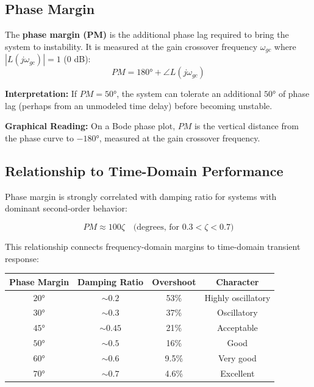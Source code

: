 \subsection{Phase Margin}

\begin{definition}
\label{def:phase_margin}
The \textbf{phase margin (PM)} is the additional phase lag required to bring the system to instability. It is measured at the gain crossover frequency $\omega_{gc}$ where $|L(j\omega_{gc})| = 1$ (0 dB):
\begin{equation}
PM = 180° + \angle L(j\omega_{gc})
\end{equation}
\end{definition}

\textbf{Interpretation:} If $PM = 50°$, the system can tolerate an additional $50°$ of phase lag (perhaps from an unmodeled time delay) before becoming unstable.

\textbf{Graphical Reading:} On a Bode phase plot, $PM$ is the vertical distance from the phase curve to $-180°$, measured at the gain crossover frequency.

\subsection{Relationship to Time-Domain Performance}

Phase margin is strongly correlated with damping ratio for systems with dominant second-order behavior:

\begin{equation}
PM \approx 100\zeta \quad \text{(degrees, for } 0.3 < \zeta < 0.7\text{)}
\label{eq:pm_zeta}
\end{equation}

This relationship connects frequency-domain margins to time-domain transient response:

\begin{center}
\begin{tabular}{cccc}
\toprule
\textbf{Phase Margin} & \textbf{Damping Ratio} & \textbf{Overshoot} & \textbf{Character} \\
\midrule
$20°$ & $\sim 0.2$ & 53\% & Highly oscillatory \\
$30°$ & $\sim 0.3$ & 37\% & Oscillatory \\
$45°$ & $\sim 0.45$ & 21\% & Acceptable \\
$50°$ & $\sim 0.5$ & 16\% & Good \\
$60°$ & $\sim 0.6$ & 9.5\% & Very good \\
$70°$ & $\sim 0.7$ & 4.6\% & Excellent \\
\bottomrule
\end{tabular}
\end{center}

